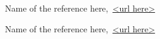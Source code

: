 \cleardoublepage
{}

\begin{thebibliography}{99}

Name of the reference here,\ \url{<url here>}

Name of the reference here,\ \url{<url here>}

\end{thebibliography}

